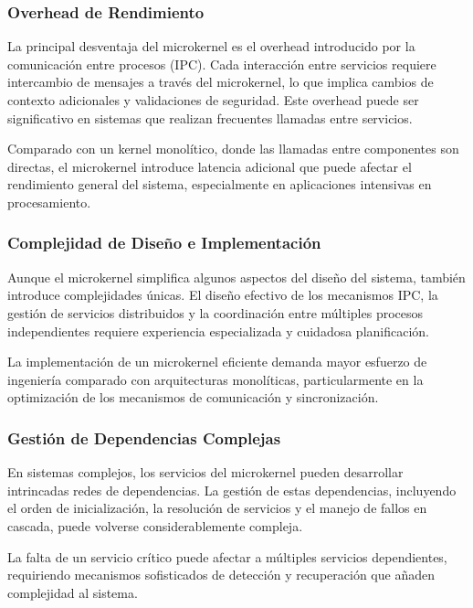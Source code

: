 \documentclass[12pt,a4paper]{article}
\begin{document}
\subsubsection{Overhead de Rendimiento}

La principal desventaja del microkernel es el overhead introducido por la comunicación entre procesos (IPC). Cada interacción entre servicios requiere intercambio de mensajes a través del microkernel, lo que implica cambios de contexto adicionales y validaciones de seguridad. Este overhead puede ser significativo en sistemas que realizan frecuentes llamadas entre servicios.

Comparado con un kernel monolítico, donde las llamadas entre componentes son directas, el microkernel introduce latencia adicional que puede afectar el rendimiento general del sistema, especialmente en aplicaciones intensivas en procesamiento.

\subsubsection{Complejidad de Diseño e Implementación}

Aunque el microkernel simplifica algunos aspectos del diseño del sistema, también introduce complejidades únicas. El diseño efectivo de los mecanismos IPC, la gestión de servicios distribuidos y la coordinación entre múltiples procesos independientes requiere experiencia especializada y cuidadosa planificación.

La implementación de un microkernel eficiente demanda mayor esfuerzo de ingeniería comparado con arquitecturas monolíticas, particularmente en la optimización de los mecanismos de comunicación y sincronización.

\subsubsection{Gestión de Dependencias Complejas}

En sistemas complejos, los servicios del microkernel pueden desarrollar intrincadas redes de dependencias. La gestión de estas dependencias, incluyendo el orden de inicialización, la resolución de servicios y el manejo de fallos en cascada, puede volverse considerablemente compleja.

La falta de un servicio crítico puede afectar a múltiples servicios dependientes, requiriendo mecanismos sofisticados de detección y recuperación que añaden complejidad al sistema.
\end{document}
